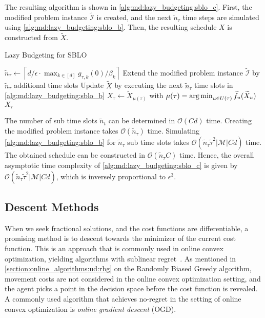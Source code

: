 The resulting algorithm is shown in \cref{alg:md:lazy_budgeting:sblo_c}. First, the modified problem instance $\widetilde{\mathcal{I}}$ is created, and the next $\widetilde{n}_{\tau}$ time steps are simulated using \cref{alg:md:lazy_budgeting:sblo_b}. Then, the resulting schedule $X$ is constructed from $\widetilde{X}$.

\begin{algorithm}
    \caption{Lazy Budgeting for SBLO~\cite{Albers2021_2}}\label{alg:md:lazy_budgeting:sblo_c}
    $\widetilde{n}_{\tau} \gets \left\lceil d / \epsilon \cdot \max_{k \in [d]} g_{\tau,k}(0) / \beta_k\right\rceil$\;
    Extend the modified problem instance $\widetilde{\mathcal{I}}$ by $\widetilde{n}_{\tau}$ additional time slots\;
    Update $\widetilde{X}$ by executing the next $\widetilde{n}_{\tau}$ time slots in \cref{alg:md:lazy_budgeting:sblo_b}\;
    $X_{\tau} \gets \widetilde{X}_{\mu(\tau)}$ with $\mu(\tau) = \operatorname*{arg\,min}_{u \in U(\tau)} \widetilde{f}_u(\widetilde{X}_u)$\;
    \Return $X_{\tau}$\;
\end{algorithm}

The number of sub time slots $\widetilde{n}_t$ can be determined in $\mathcal{O}(C d)$ time. Creating the modified problem instance takes $\mathcal{O}(\widetilde{n}_{\tau})$ time. Simulating \cref{alg:md:lazy_budgeting:sblo_b} for $\widetilde{n}_{\tau}$ sub time slots takes $\mathcal{O}(\widetilde{n}_{\tau} \widetilde{\tau}^2 |\mathcal{M}| C d)$ time. The obtained schedule can be constructed in $\mathcal{O}(\widetilde{n}_{\tau} C)$ time. Hence, the overall asymptotic time complexity of \cref{alg:md:lazy_budgeting:sblo_c} is given by $\mathcal{O}(\widetilde{n}_{\tau} \widetilde{\tau}^2 |\mathcal{M}| C d)$, which is inversely proportional to $\epsilon^3$.

\subsection{Descent Methods}\label{section:online_algorithms:md:descent_methods}

When we seek fractional solutions, and the cost functions are differentiable, a promising method is to descent towards the minimizer of the current cost function. This is an approach that is commonly used in online convex optimization, yielding algorithms with sublinear regret~\cite{Andrew2015}. As mentioned in \cref{section:online_algorithms:ud:rbg} on the Randomly Biased Greedy algorithm, movement costs are not considered in the online convex optimization setting, and the agent picks a point in the decision space before the cost function is revealed. A commonly used algorithm that achieves no-regret in the setting of online convex optimization is \emph{online gradient descent} (OGD).

